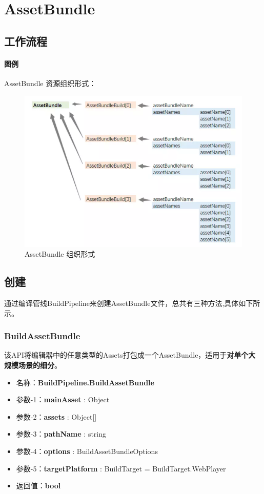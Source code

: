 \documentclass[UTF8,a4paper,12pt]{ctexbook}
\begin{document}
	\section{AssetBundle}	
		\subsection{工作流程}
			
			\paragraph{图例}AssetBundle 资源组织形式：
				\begin{figure}[H]
					\centering
					\includegraphics[scale=0.7]{AssetBundle}
					\caption{AssetBundle 组织形式}
				\end{figure}
				
		\subsection{创建}
			通过编译管线BuildPipeline来创建AssetBundle文件，总共有三种方法,具体如下所示。
			\subsubsection{BuildAssetBundle}
				该API将编辑器中的任意类型的Assets打包成一个AssetBundle，适用于\textbf{对单个大规模场景的细分}。
				
				\begin{itemize}
					\item 名称：\textbf{BuildPipeline.BuildAssetBundle}
					\item 参数-1：\textbf{mainAsset} : Object
					\item 参数-2：\textbf{assets} : Object[]
					\item 参数-3：\textbf{pathName} : string
					\item 参数-4：\textbf{options} : BuildAssetBundleOptions
					\item 参数-5：\textbf{targetPlatform} : BuildTarget = BuildTarget.WebPlayer
					\item 返回值：\textbf{bool}
				\end{itemize}
				
\end{document}
